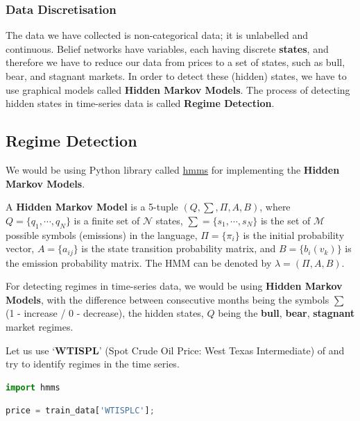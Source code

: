 \hypertarget{data-discretisation}{%
\subsubsection{Data Discretisation}\label{data-discretisation}}

The data we have collected is non-categorical data; it is unlabelled and
continuous. Belief networks have variables, each having discrete
\textbf{states}, and therefore we have to reduce our data from prices to
a set of states, such as bull, bear, and stagnant markets. In order to
detect these (hidden) states, we have to use graphical models called
\textbf{Hidden Markov Models}. The process of detecting hidden states in
time-series data is called \textbf{Regime Detection}.

\hypertarget{regime-detection}{%
\subsection{Regime Detection}\label{regime-detection}}

We would be using Python library called
\href{https://github.com/lopatovsky/HMMs}{hmms} for implementing the
\textbf{Hidden Markov Models}.

A \textbf{Hidden Markov Model} is a 5-tuple \((Q, \sum, \Pi, A, B)\),
where \(Q = \{q_{1}, \cdots, q_{N}\}\) is a finite set of
\(\mathcal{N}\) states, \(\sum = \{s_1, \cdots, s_{N}\}\) is the set of
\(\mathcal{M}\) possible symbols (emissions) in the language,
\(\Pi = \{\pi_{i}\}\) is the initial probability vector,
\(A = \{a_{ij}\}\) is the state transition probability matrix, and
\(B = \{b_i(v_k)\}\) is the emission probability matrix. The HMM can be
denoted by \(\lambda = (\Pi, A, B)\).

For detecting regimes in time-series data, we would be using
\textbf{Hidden Markov Models}, with the difference between consecutive
months being the symbols \(\sum\) (1 - increase / 0 - decrease), the
hidden states, \(Q\) being the \textbf{bull}, \textbf{bear},
\textbf{stagnant} market regimes.

Let us use `\textbf{WTISPL}' (Spot Crude Oil Price: West Texas
Intermediate) of and try to identify regimes in the time series.

\begin{lstlisting}[language=Python]
import hmms
\end{lstlisting}

\begin{lstlisting}[language=Python]
price = train_data['WTISPLC'];
\end{lstlisting}

